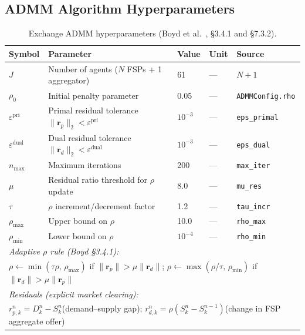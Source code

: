 \subsection*{ADMM Algorithm Hyperparameters}

\begin{table}[htbp]
\centering
\caption{Exchange ADMM hyperparameters (Boyd et al.~\cite{stephen_distributed_2011}, \S3.4.1 and \S7.3.2).}
\label{tab:admm}
\begin{tabular}{lllll}
\toprule
Symbol & Parameter & Value & Unit & Source \\
\midrule
$J$                  & Number of agents ($N$ FSPs + 1 aggregator) & 61 & — & $N+1$ \\
$\rho_0$             & Initial penalty parameter                  & 0.05  & — & \texttt{ADMMConfig.rho} \\
$\varepsilon^\text{pri}$ & Primal residual tolerance $\|\mathbf{r}_p\|_2 < \varepsilon^\text{pri}$ & $10^{-3}$ & — & \texttt{eps\_primal} \\
$\varepsilon^\text{dual}$ & Dual residual tolerance $\|\mathbf{r}_d\|_2 < \varepsilon^\text{dual}$ & $10^{-3}$ & — & \texttt{eps\_dual} \\
$n_\text{max}$       & Maximum iterations                         & 200   & — & \texttt{max\_iter} \\
$\mu$                & Residual ratio threshold for $\rho$ update & 8.0   & — & \texttt{mu\_res} \\
$\tau$               & $\rho$ increment/decrement factor           & 1.2   & — & \texttt{tau\_incr} \\
$\rho_\text{max}$    & Upper bound on $\rho$                      & 10.0  & — & \texttt{rho\_max} \\
$\rho_\text{min}$    & Lower bound on $\rho$                      & $10^{-4}$ & — & \texttt{rho\_min} \\
\midrule
\multicolumn{5}{l}{\textit{Adaptive $\rho$ rule (Boyd \S3.4.1):}} \\
\multicolumn{5}{l}{%
  $\rho \leftarrow \min(\tau\rho,\,\rho_\text{max})$ if $\|\mathbf{r}_p\| > \mu\|\mathbf{r}_d\|$;\quad
  $\rho \leftarrow \max(\rho/\tau,\,\rho_\text{min})$ if $\|\mathbf{r}_d\| > \mu\|\mathbf{r}_p\|$%
} \\
\midrule
\multicolumn{5}{l}{\textit{Residuals (explicit market clearing):}} \\
\multicolumn{5}{l}{%
  $r_{p,k}^n = D_k^n - S_k^n$\quad (demand–supply gap);\quad
  $r_{d,k}^n = \rho(S_k^n - S_k^{n-1})$\quad (change in FSP aggregate offer)%
} \\
\bottomrule
\end{tabular}
\end{table}

